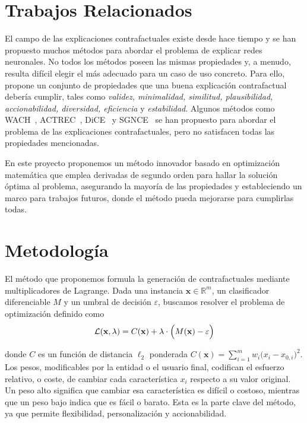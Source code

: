 \documentclass[12pt]{extarticle}
\numberwithin{equation}{section}
\begin{document}
\section*{Trabajos Relacionados}
El campo de las explicaciones contrafactuales existe desde hace tiempo y se han propuesto muchos métodos para abordar el problema de explicar redes neuronales. No todos los métodos poseen las mismas propiedades y, a menudo, resulta difícil elegir el más adecuado para un caso de uso concreto. Para ello, \cite{guidotti2024counterfactual} propone un conjunto de propiedades que una buena explicación contrafactual debería cumplir, tales como \emph{validez, minimalidad, similitud, plausibilidad, accionabilidad, diversidad, eficiencia} y \emph{estabilidad}. Algunos métodos como WACH~\cite{wachter2017counterfactual}, ACTREC~\cite{ustun2019actionable}, DiCE~\cite{dice} y SGNCE~\cite{sgnce} se han propuesto para abordar el problema de las explicaciones contrafactuales, pero no satisfacen todas las propiedades mencionadas.

En este proyecto proponemos un método innovador basado en optimización matemática que emplea derivadas de segundo orden para hallar la solución óptima al problema, asegurando la mayoría de las propiedades y estableciendo un marco para trabajos futuros, donde el método pueda mejorarse para cumplirlas todas.

\section*{Metodología}
El método que proponemos formula la generación de contrafactuales mediante multiplicadores de Lagrange. Dada una instancia $\mathbf{x} \in \mathbb{R}^m$, un clasificador diferenciable $M$ y un umbral de decisión $\varepsilon$, buscamos resolver el problema de optimización definido como
\begin{equation}
\label{eq:lagrangian_eqn_es}
\mathcal{L}(\mathbf{x}, \lambda) = C(\mathbf{x}) + \lambda \cdot \Bigl(M(\mathbf{x}) - \varepsilon \Bigr)
\end{equation}

donde $C$ es un función de distancia $\ell_2$ ponderada $C(\mathbf{x}) = \sum_{i=1}^m w_i\bigl(x_i - x_{0,i}\bigr)^2$. Los pesos, modificables por la entidad o el usuario final, codifican el esfuerzo relativo, o coste, de cambiar cada característica $x_i$ respecto a su valor original. Un peso alto significa que cambiar esa característica es difícil o costoso, mientras que un peso bajo indica que es fácil o barato. Esta es la parte clave del método, ya que permite flexibilidad, personalización y accionabilidad.
\end{document}
